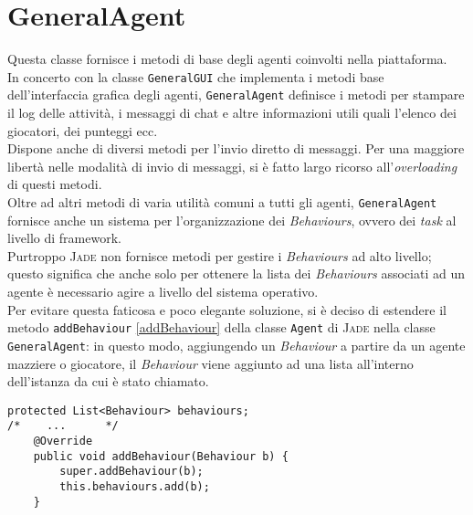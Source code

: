 \section{GeneralAgent}


Questa classe fornisce i metodi di base degli agenti coinvolti nella piattaforma.\\
In concerto con la classe \texttt{GeneralGUI} che implementa i metodi base dell'interfaccia grafica degli agenti, \texttt{GeneralAgent} definisce i metodi per stampare il log delle attività, i messaggi di chat e altre informazioni utili quali l'elenco dei giocatori, dei punteggi ecc.\\
Dispone anche di diversi metodi per l'invio diretto di messaggi. Per una maggiore libertà nelle modalità di invio di messaggi, si è fatto largo ricorso all'\emph{overloading} di questi metodi.\\
Oltre ad altri metodi di varia utilità comuni a tutti gli agenti, \texttt{GeneralAgent} fornisce anche un sistema per l'organizzazione dei \emph{Behaviours}, ovvero dei \emph{task} al livello di framework.\\
Purtroppo \textsc{Jade} non fornisce metodi per gestire i \emph{Behaviours} ad alto livello; questo significa che anche solo per ottenere la lista dei \emph{Behaviours} associati ad un agente è necessario agire a livello del sistema operativo.\\
Per evitare questa faticosa e poco elegante soluzione, si è deciso di estendere il metodo \texttt{addBehaviour} \ref{addBehaviour} della classe \texttt{Agent} di \textsc{Jade} nella classe \texttt{GeneralAgent}: in questo modo, aggiungendo un \emph{Behaviour} a partire da un agente mazziere o giocatore, il \emph{Behaviour} viene aggiunto ad una lista all'interno dell'istanza da cui è stato chiamato.

\lstset{numbers=left, numberstyle=\tiny, stepnumber=1,firstnumber=1,
  numbersep=5pt,language=Java,
stringstyle=\ttfamily,
basicstyle=\footnotesize, 
showstringspaces=false,
breaklines=true
}
\begin{lstlisting}[caption={},label=addBehaviour]
protected List<Behaviour> behaviours;
/*    ...      */
    @Override
    public void addBehaviour(Behaviour b) {
        super.addBehaviour(b);
        this.behaviours.add(b);
    }
\end{lstlisting}
